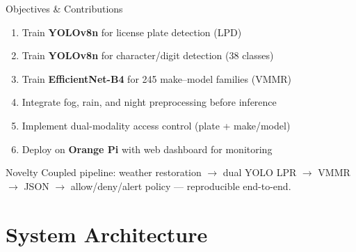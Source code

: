 \documentclass[aspectratio=169,11pt]{beamer}
\begin{document}
\begin{frame}{Objectives \& Contributions}
  \begin{enumerate}
    \item Train \textbf{YOLOv8n} for license plate detection (LPD)
    \item Train \textbf{YOLOv8n} for character/digit detection (38 classes)
    \item Train \textbf{EfficientNet-B4} for 245 make--model families (VMMR)
    \item Integrate fog, rain, and night preprocessing before inference
    \item Implement dual-modality access control (plate + make/model)
    \item Deploy on \textbf{Orange Pi} with web dashboard for monitoring
  \end{enumerate}
  \vspace{0.5em}
  \begin{alertblock}{Novelty}
    Coupled pipeline: weather restoration $\rightarrow$ dual YOLO LPR $\rightarrow$ VMMR
    $\rightarrow$ JSON $\rightarrow$ allow/deny/alert policy --- reproducible end-to-end.
  \end{alertblock}
\end{frame}

\section{System Architecture}
\end{document}

